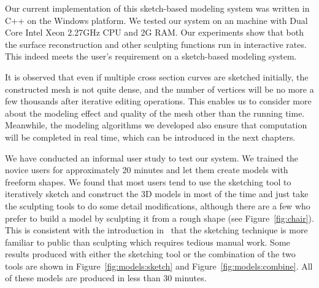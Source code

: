 Our current implementation of this sketch-based modeling system was
written  in C++ on the Windows platform. We tested our system on an
machine with Dual Core Intel Xeon 2.27GHz CPU and 2G RAM. Our
experiments show that both the surface reconstruction and other
sculpting functions run in interactive rates. This indeed meets the
user's requirement on a sketch-based modeling system.

It is observed that even if multiple cross section curves are
sketched initially, the constructed mesh is not quite dense, and
the number of vertices will be no more a few thousands after
iterative editing operations. This enables us to consider more about
the modeling effect and quality of the mesh other than the running
time. Meanwhile, the modeling algorithms we developed also ensure
that computation will be completed in real time, which can be
introduced in the next chapters.


We have conducted an informal user study to test our system.  We
trained the novice users for approximately 20 minutes and let them
create models with freeform shapes. We found that most users tend to
use the sketching tool to iteratively sketch and construct the 3D
models in most of the time and just take the sculpting tools to do
some detail modifications, although there are a few who prefer to
build a model by sculpting it from a rough shape (see
Figure~\ref{fig:chair}). This is consistent with the introduction
in~\cite{CIW08} that the sketching technique is more familiar to
public than sculpting which requires tedious manual work. Some
results produced with either the sketching tool or the combination
of the two tools are shown in Figure~\ref{fig:models:sketch} and
Figure~\ref{fig:models:combine}. All of these models are produced in
less than 30 minutes.

